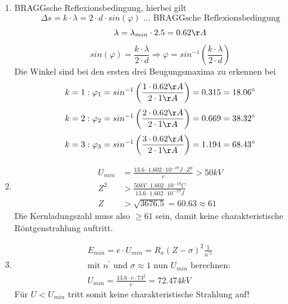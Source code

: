 \documentclass[12pt,a4paper,ngerman]{article}
\begin{document}
\begin{enumerate}
\item BRAGGsche Reflexionsbedingung, hierbei gilt
\begin{equation*}
\Delta s = k \cdot \lambda = 2 \cdot d \cdot sin(\varphi) \text{ ... BRAGGsche Reflexionsbedingung}
\end{equation*}
\begin{equation*}
\lambda = \lambda_{min} \cdot 2.5 = 0.62 \AA
\end{equation*}
\begin{equation*}
sin(\varphi) = \frac{k \cdot \lambda}{2 \cdot d} \Rightarrow \varphi = sin^{-1}\left(\frac{k \cdot \lambda}{2 \cdot d}\right)
\end{equation*}
Die Winkel sind bei den ersten drei Beugungsmaxima zu erkennen bei
\begin{equation*}
k=1: \varphi_1 = sin^{-1}\left(\frac{1 \cdot 0.62\AA}{2 \cdot 1\AA}\right) = 0.315 = 18.06^\circ
\end{equation*}
\begin{equation*}
k=2: \varphi_2 = sin^{-1}\left(\frac{2 \cdot 0.62\AA}{2 \cdot 1\AA}\right) = 0.669 = 38.32^\circ
\end{equation*}
\begin{equation*}
k=3: \varphi_3 = sin^{-1}\left(\frac{3 \cdot 0.62\AA}{2 \cdot 1\AA}\right) = 1.194 = 68.43^\circ
\end{equation*}
\item
\begin{align*}
U_{min} &= \frac{13.6 \cdot 1.602\cdot 10^{-19}J \cdot Z^2}{e} > 50kV \\
Z^2 &> \frac{50kV \cdot 1.602\cdot 10^{-19}C}{13.6 \cdot 1.602 \cdot 10^{-19}J} \\
Z &> \sqrt{3676.5} = 60.63 \approx 61
\end{align*}
Die Kernladungszahl muss also $\geq 61$ sein, damit keine charakteristische Röntgenstrahlung auftritt. 
\pagebreak
\item 
\begin{align*}
E_{min} = e \cdot U_{min} = R_x(Z-\sigma)^2 \frac{1}{n^{'2}} \\
\text{mit } n^{'} \text{ und } \sigma \approx 1 \text{ nun } U_{min} \text{ berechnen: } \\
U_{min} = \frac{13.6 \cdot e \cdot 73^2}{e} = 72.474kV
\end{align*}
Für $U<U_{min}$ tritt somit keine charakteristische Strahlung auf!

\end{enumerate}
\end{document}
